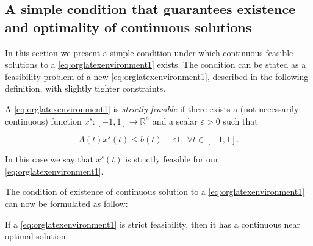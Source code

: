 \documentclass[moor]{informs1}
\begin{document}
\subsection{A simple condition that guarantees existence and optimality of continuous solutions}
\label{sec:orgheadline8}

In this section we present a simple condition under which continuous feasible solutions to a \ref{eq:orglatexenvironment1} exists. The condition can be stated as a feasibility problem of a new \ref{eq:orglatexenvironment1}, described in the following definition, with slightly tighter constraints.

\begin{definition}
A \ref{eq:orglatexenvironment1} is \emph{strictly feasible} if there exists a (not necessarily continuous) function \(x^s: [-1, 1] \rightarrow \mathbb R^n\)   and a scalar \(\varepsilon > 0\) such that

$$A(t)x^s(t) \le b(t) - \varepsilon 1, \; \forall t \in [-1, 1].$$

\noindent In this case we say that \(x^s(t)\) is strictly feasible for our \ref{eq:orglatexenvironment1}.
\label{orgspecialblock13}

\end{definition}

The condition of existence of continuous solution to a \ref{eq:orglatexenvironment1} can now be formulated as follow:

\begin{thm}
If a \ref{eq:orglatexenvironment1}  is strict feasibility, then it has a continuous near optimal solution.
\label{orgspecialblock14}

\end{thm}
\end{document}
